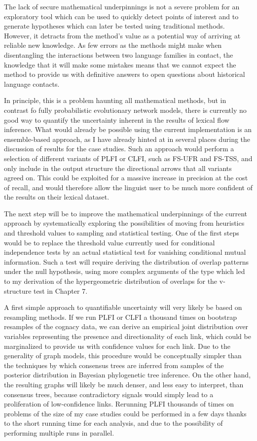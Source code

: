 The lack of secure mathematical underpinnings is not a severe problem for an exploratory tool which can be used to quickly detect points of interest and to generate hypotheses which can later be tested using traditional methods. However, it detracts from the method's value as a potential way of arriving at reliable new knowledge. As few errors as the methods might make when disentangling the interactions between two language families in contact, the knowledge that it will make some mistakes means that we cannot expect the method to provide us with definitive answers to open questions about historical language contacts. 

In principle, this is a problem haunting all mathematical methods, but in contrast fo fully probabilistic evolutionary network models, there is currently no good way to quantify the uncertainty inherent in the results of lexical flow inference. What would already be possible using the current implementation is an ensemble-based approach, as I have already hinted at in several places during the discussion of results for the case studies. Such an approach would perform a selection of different variants of PLFI or CLFI, such as FS-UFR and FS-TSS, and only include in the output structure the directional arrows that all variants agreed on. This could be exploited for a massive increase in precision at the cost of recall, and would therefore allow the linguist user to be much more confident of the results on their lexical dataset.

The next step will be to improve the mathematical underpinnings of the current approach by systematically exploring the possibilities of moving from heuristics and threshold values to sampling and statistical testing. One of the first steps would be to replace the threshold value currently used for conditional independence tests by an actual statistical test for vanishing conditional mutual information. Such a test will require deriving the distribution of overlap patterns under the null hypothesis, using more complex arguments of the type which led to my derivation of the hypergeometric distribution of overlaps for the v-structure test in Chapter 7.

A first simple approach to quantifiable uncertainty will very likely be based on resampling methods. If we run PLFI or CLFI a thousand times on bootstrap resamples of the cognacy data, we can derive an empirical joint distribution over variables representing the presence and directionality of each link, which could be marginalized to provide us with confidence values for each link. Due to the generality of graph models, this procedure would be conceptually simpler than the techniques by which consensus trees are inferred from samples of the posterior distribution in Bayesian phylogenetic tree inference. On the other hand, the resulting graphs will likely be much denser, and less easy to interpret, than consensus trees, because contradictory signals would simply lead to a proliferation of low-confidence links. Rerunning PLFI thousands of times on problems of the size of my case studies could be performed in a few days thanks to the short running time for each analysis, and due to the possibility of performing multiple runs in parallel.

